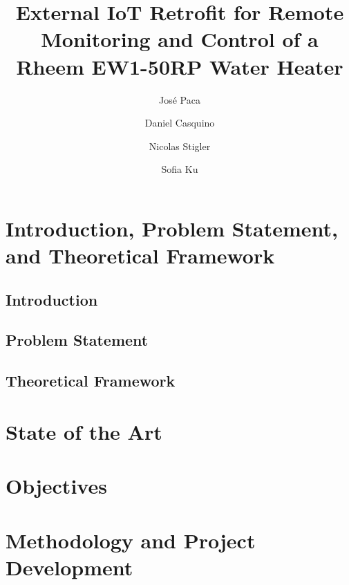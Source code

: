 \documentclass[manuscript,screen,nonacm]{acmart}
\begin{document}
\title{External IoT Retrofit for Remote Monitoring and Control of a Rheem EW1-50RP Water Heater}
\author{José Paca}
\author{Daniel Casquino}
\author{Nicolas Stigler}
\author{Sofia Ku}
\begin{abstract}

\end{abstract}
\maketitle
{}
\section{Introduction, Problem Statement, and Theoretical Framework}
\subsection{Introduction}

\subsection{Problem Statement}

\subsection{Theoretical Framework}

\section{State of the Art}

\section{Objectives}

\section{Methodology and Project Development}


\end{document}
